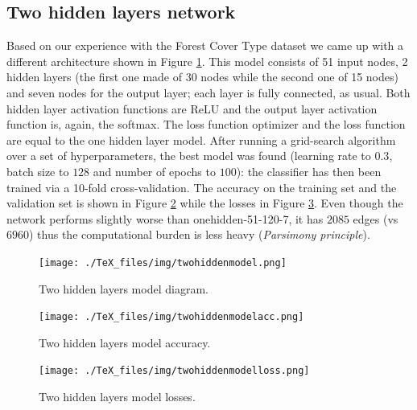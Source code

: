 \subsection{Two hidden layers network}
\label{sec:twohidden}
Based on our experience with the Forest Cover Type dataset we came up with a different architecture shown in Figure \ref{fig:twohiddenmodel}. This model consists of 51 input nodes, 2 hidden layers (the first one made of 30 nodes while the second one of 15 nodes) and seven nodes for the output layer; each layer is fully connected, as usual. Both hidden layer activation functions are ReLU and the output layer activation function is, again, the softmax. The loss function optimizer and the loss function are equal to the one hidden layer model.
After running a grid-search algorithm over a set of hyperparameters, the best model was found (learning rate to $0.3$, batch size to $128$ and number of epochs to $100$): the classifier has then been trained via a 10-fold cross-validation. The accuracy on the training set and the validation set is shown in Figure \ref{fig:twohiddenmodelacc} while the losses in Figure \ref{fig:twohiddenmodelloss}. Even though the network performs slightly worse than onehidden-51-120-7, it has $2085$ edges (vs $6960$) thus the computational burden is less heavy (\textit{Parsimony principle}\cite{gori}).

\begin{figure}
\centering
\texttt{[image: ./TeX\_files/img/twohiddenmodel.png]}
\caption{Two hidden layers model diagram.}
\label{fig:twohiddenmodel}
\end{figure}

\begin{figure}[H]
\centering
\texttt{[image: ./TeX\_files/img/twohiddenmodelacc.png]}
\caption{Two hidden layers model accuracy.}
\label{fig:twohiddenmodelacc}
\end{figure}

\begin{figure}
\centering
\texttt{[image: ./TeX\_files/img/twohiddenmodelloss.png]}
\caption{Two hidden layers model losses.}
\label{fig:twohiddenmodelloss}
\end{figure}

